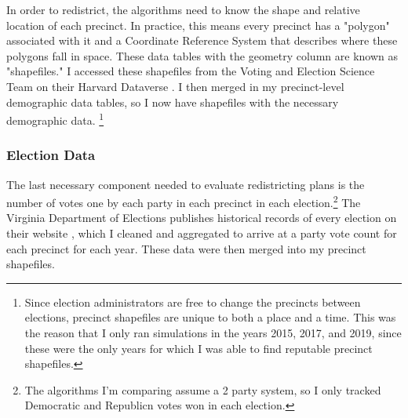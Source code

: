 In order to redistrict, the algorithms need to know the shape and relative location of each precinct. In practice, this means every precinct has a "polygon" associated with it and a Coordinate Reference System that describes where these polygons fall in space. These data tables with the geometry column are known as "shapefiles." I accessed these shapefiles from the Voting and Election Science Team on their Harvard Dataverse \parencite{votingandelectionscienceteam2019a,votingandelectionscienceteam2019,votingandelectionscienceteam2019b}. I then merged in my precinct-level demographic data tables, so I now have shapefiles with the necessary demographic data. \footnote{Since election administrators are free to change the precincts between elections, precinct shapefiles are unique to both a place and a time. This was the reason that I only ran simulations in the years 2015, 2017, and 2019, since these were the only years for which I was able to find reputable precinct shapefiles.}

\subsubsection{Election Data}

The last necessary component needed to evaluate redistricting plans is the number of votes one by each party in each precinct in each election.\footnote{The algorithms I'm comparing assume a 2 party system, so I only tracked Democratic and Republicn votes won in each election.} The Virginia Department of Elections publishes historical records of every election on their website \parencite{virginiadepartmentofelections}, which I cleaned and aggregated to arrive at a party vote count for each precinct for each year. These data were then merged into my precinct shapefiles.